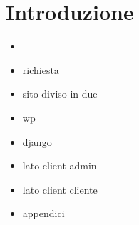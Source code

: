 \chapter{Introduzione} 

\begin{itemize}
 \item {\fem}
 \item richiesta {\fem}
 \item sito diviso in due
 \item wp
 \item django
 \item lato client admin
 \item lato client cliente
 \item appendici
\end{itemize}